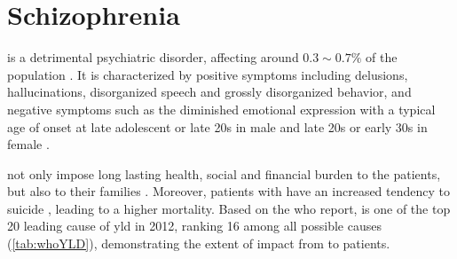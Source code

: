 
	\section{Schizophrenia}
	 is a detrimental psychiatric disorder, affecting around $0.3\sim0.7\%$ of the population \citep{AmericanPsychiatricAssociation2013}.
	It is characterized by positive symptoms including delusions, hallucinations, disorganized speech and grossly disorganized behavior, and negative symptoms such as the diminished emotional expression \citep{AmericanPsychiatricAssociation2013} with a typical age of onset at late adolescent or late 20s in male and late 20s or early 30s in female \citep{Schultz2007}.
	
	 not only impose long lasting health, social and financial burden to the patients, but also to their families \citep{Knapp2004}. 
	Moreover, patients with  have an increased tendency to suicide \citep{Saha2007}, leading to a higher mortality.
	Based on the \gls{who} report,  is one of the top 20 leading cause of \gls{yld} in 2012, ranking 16 among all possible causes (\cref{tab:whoYLD}), demonstrating the extent of impact from  to patients.
